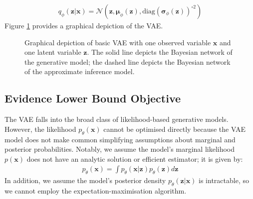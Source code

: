 \documentclass[ oneside,%
                    author={George Herbert},
                    degree={MSci},
                     title={Diffusion Models for Time-Evolving Precipitation Fields},
                  subtitle={}]{dissertation}
\begin{document}
\begin{align}
      q_\phi(\mathbf{z}|\mathbf{x})=\mathcal{N}(\mathbf{z}, \boldsymbol{\mu}_\phi(\mathbf{z}), \mathrm{diag}(\boldsymbol\sigma_\phi(\mathbf{z}))^{\circ 2})
\end{align}
Figure \ref{fig:vae} provides a graphical depiction of the VAE.
\begin{figure}[htbp]
      \centering
      \caption{Graphical depiction of basic VAE with one observed variable $\mathbf{x}$ and one latent variable $\mathbf{z}$. The solid line depicts the Bayesian network of the generative model; the dashed line depicts the Bayesian network of the approximate inference model.}
      \label{fig:vae}
\end{figure}

\subsection{Evidence Lower Bound Objective}
\label{sec:background_vae_elbo}

The VAE falls into the broad class of likelihood-based generative models. However, the likelihood $p_\theta(\mathbf{x})$ cannot be optimised directly because the VAE model does not make common simplifying assumptions about marginal and posterior probabilities. Notably, we assume the model's marginal likelihood $p(\mathbf{x})$ does not have an analytic solution or efficient estimator; it is given by:
\begin{align}
      p_\theta(\mathbf{x}) = \int p_\theta(\mathbf{x}|\mathbf{z})p_\theta(\mathbf{z}) d\mathbf{z}
\end{align}
In addition, we assume the model's posterior density $p_\theta(\mathbf{z}|\mathbf{x})$ is intractable, so we cannot employ the expectation-maximisation algorithm.
\end{document}
